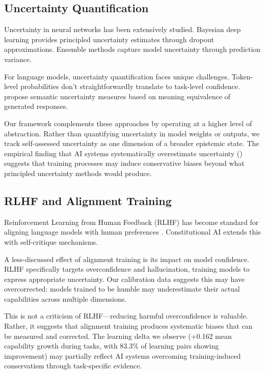 \subsection{Uncertainty Quantification}

Uncertainty in neural networks has been extensively studied. Bayesian deep learning \citep{gal2016dropout} provides principled uncertainty estimates through dropout approximations. Ensemble methods \citep{lakshminarayanan2017simple} capture model uncertainty through prediction variance.

For language models, uncertainty quantification faces unique challenges. Token-level probabilities don't straightforwardly translate to task-level confidence. \citet{kuhn2023semantic} propose semantic uncertainty measures based on meaning equivalence of generated responses.

Our framework complements these approaches by operating at a higher level of abstraction. Rather than quantifying uncertainty in model weights or outputs, we track self-assessed uncertainty as one dimension of a broader epistemic state. The empirical finding that AI systems systematically overestimate uncertainty () suggests that training processes may induce conservative biases beyond what principled uncertainty methods would produce.

\subsection{RLHF and Alignment Training}

Reinforcement Learning from Human Feedback (RLHF) has become standard for aligning language models with human preferences \citep{ouyang2022training}. Constitutional AI \citep{bai2022constitutional} extends this with self-critique mechanisms.

A less-discussed effect of alignment training is its impact on model confidence. RLHF specifically targets overconfidence and hallucination, training models to express appropriate uncertainty. Our calibration data suggests this may have overcorrected: models trained to be humble may underestimate their actual capabilities across multiple dimensions.

This is not a criticism of RLHF---reducing harmful overconfidence is valuable. Rather, it suggests that alignment training produces systematic biases that can be measured and corrected. The learning delta we observe (+0.162 mean capability growth during tasks, with 83.3\% of learning pairs showing improvement) may partially reflect AI systems overcoming training-induced conservatism through task-specific evidence.

